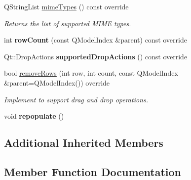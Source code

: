 \begin{DoxyCompactItemize}
\mbox{\label{classrev_1_1_view_1_1_resources_model_ab501c37c67a3ff19fe33c3231fd701dc}} 
Q\+String\+List \mbox{\hyperlink{classrev_1_1_view_1_1_resources_model_ab501c37c67a3ff19fe33c3231fd701dc}{mime\+Types}} () const override
\begin{DoxyCompactList}\small\item\em Returns the list of supported M\+I\+ME types. \end{DoxyCompactList}\item 
\mbox{\label{classrev_1_1_view_1_1_resources_model_ac828ff1cdd5dabd2d9c54dfddfa74137}} 
int {\bfseries row\+Count} (const Q\+Model\+Index \&parent) const override
\item 
\mbox{\label{classrev_1_1_view_1_1_resources_model_a3b4a93322b29c2cfac3e095c439e2303}} 
Qt\+::\+Drop\+Actions {\bfseries supported\+Drop\+Actions} () const override
\item 
\mbox{\label{classrev_1_1_view_1_1_resources_model_abe2d91f3afb98055634d04833a9ed2fd}} 
bool \mbox{\hyperlink{classrev_1_1_view_1_1_resources_model_abe2d91f3afb98055634d04833a9ed2fd}{remove\+Rows}} (int row, int count, const Q\+Model\+Index \&parent=Q\+Model\+Index()) override
\begin{DoxyCompactList}\small\item\em Implement to support drag and drop operations. \end{DoxyCompactList}\item 
\mbox{\label{classrev_1_1_view_1_1_resources_model_a4cb762e4e4d52e1ea6beb4d98263b065}} 
void {\bfseries repopulate} ()
\end{DoxyCompactItemize}
\subsection*{Additional Inherited Members}


\subsection{Member Function Documentation}
\mbox{\label{classrev_1_1_view_1_1_resources_model_a993b8815a725f3d2ee66008992621f48}} 
